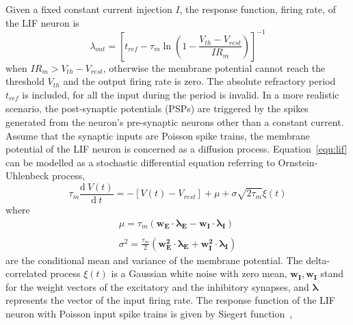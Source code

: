 \documentclass[journal]{journal}
\def\D{\mathrm{d}}
\begin{document}
Given a fixed constant current injection $I$, the response function, firing rate, of the LIF neuron is
\begin{equation}
\lambda_\mathit{out}=
\left [ t_\mathit{ref}-\tau_m\ln \left ( 1-\frac{V_{th}-V_\mathit{rest}}{IR_m}  \right )\right ]^{-1}
\label{equ:consI}
\end{equation}
when $IR_m>V_{th}-V_{rest}$, otherwise the membrane potential cannot reach the threshold $V_{th}$ and the output firing rate is zero. 
The absolute refractory period $t_\mathit{ref}$ is included, for all the input during the period is invalid.
In a more realistic scenario, the post-synaptic potentials (PSPs) are triggered by the spikes generated from the neuron's pre-synaptic neurons other than a constant current.
Assume that the synaptic inputs are Poisson spike trains, the membrane potential of the LIF neuron is concerned as a diffusion process. Equation~\ref{equ:lif} can be modelled as a stochastic differential equation referring to Ornstein-Uhlenbeck process,
\begin{equation}
\tau_m\frac{\D\:V(t)}{\D\:  t}=-\left[V(t)-V_\mathit{rest}\right] + \mu + \sigma\sqrt{2\tau_m}\xi (t)
\label{equ:sde}
\end{equation}
where
\begin{equation}
\begin{array}{l}
\mu=\tau_m(\mathbf{w_E\cdot\lambda_E}-\mathbf{w_I\cdot\lambda_I})
\\
\\
\sigma ^{2} = \frac{\tau_m}{2}\left(\mathbf{w_E^{2}\cdot\lambda_E}+\mathbf{w_I^{2}\cdot\lambda_I}\right)
\end{array}
\label{equ:ou}
\end{equation}
are the conditional mean and variance of the membrane potential.
The delta-correlated process $\xi(t)$ is a Gaussian white noise with zero mean, $\mathbf{w_I},\mathbf{w_I}$ stand for the weight vectors of the excitatory and the inhibitory synapses, and $\mathbf{\lambda}$ represents the vector of the input firing rate.
The response function of the LIF neuron with Poisson input spike trains is given by Siegert function~\cite{siegert1951first}, 
\end{document}
